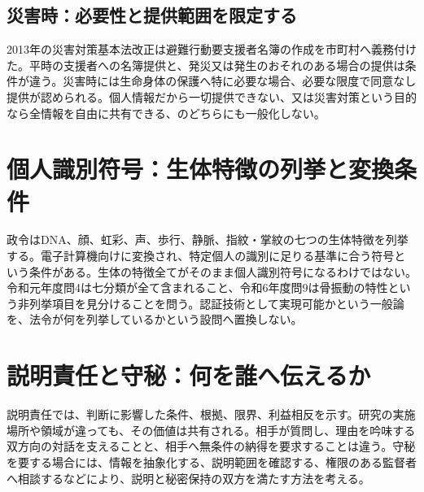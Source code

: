 \subsection{災害時：必要性と提供範囲を限定する}
\label{theory:privacy:evacuation}
2013年の災害対策基本法改正は避難行動要支援者名簿の作成を市町村へ義務付けた。平時の支援者への名簿提供と、発災又は発生のおそれのある場合の提供は条件が違う\parencite{privacy_evacuation2013,privacy_evacuation_scope}。災害時には生命身体の保護へ特に必要な場合、必要な限度で同意なし提供が認められる。個人情報だから一切提供できない、又は災害対策という目的なら全情報を自由に共有できる、のどちらにも一般化しない。

\section{個人識別符号：生体特徴の列挙と変換条件}
\label{theory:privacy:biometrics}
政令はDNA、顔、虹彩、声、歩行、静脈、指紋・掌紋の七つの生体特徴を列挙する。電子計算機向けに変換され、特定個人の識別に足りる基準に合う符号という条件がある\parencite{privacy_general}。生体の特徴全てがそのまま個人識別符号になるわけではない。令和元年度問4は七分類が全て含まれること、令和6年度問9は骨振動の特性という非列挙項目を見分けることを問う。認証技術として実現可能かという一般論を、法令が何を列挙しているかという設問へ置換しない。

\section{説明責任と守秘：何を誰へ伝えるか}
\label{theory:information:accountability}
説明責任では、判断に影響した条件、根拠、限界、利益相反を示す。研究の実施場所や領域が違っても、その価値は共有される\parencite{singapore2010}。相手が質問し、理由を吟味する双方向の対話を支えることと、相手へ無条件の納得を要求することは違う。守秘を要する場合には、情報を抽象化する、説明範囲を確認する、権限のある監督者へ相談するなどにより、説明と秘密保持の双方を満たす方法を考える。
